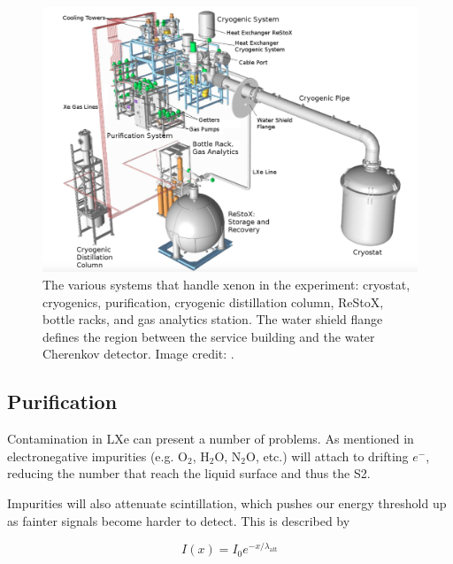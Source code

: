 \begin{figure}
\centering
\includegraphics[width=\textwidth]{CryoOverview}
\caption{The various systems that handle xenon in the experiment: cryostat, cryogenics, purification, cryogenic distillation column,
ReStoX, bottle racks, and gas analytics station.  The water shield flange defines the region between the service building and the water
Cherenkov detector.  Image credit: .}
\label{fig:xenon1t_cryo_overview}
\end{figure}



\subsection{Purification}
\label{subsec:xenon1t_pur}
Contamination in LXe can present a number of problems.  As mentioned in  electronegative
impurities (e.g. O$_2$, H$_2$O, N$_2$O, etc.) will attach to drifting $e^-$, reducing the number that reach
the liquid surface and thus the S2.

Impurities will also attenuate scintillation, which pushes our energy threshold up as fainter signals become harder to detect.  This is
described by

\begin{equation}
I(x) = I_0 e^{-x / \lambda_{\mathrm{att}}}
\label{eq:xenon1t_pur_atten}
\end{equation}


